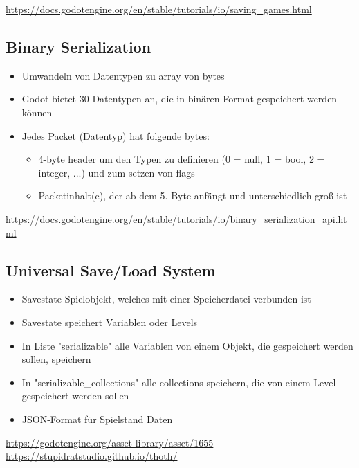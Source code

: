 \url{https://docs.godotengine.org/en/stable/tutorials/io/saving_games.html}\\

\subsection{Binary Serialization}

\begin{itemize}
    \item Umwandeln von Datentypen zu array von bytes
    \item Godot bietet 30 Datentypen an, die in binären Format gespeichert werden können
    \item Jedes Packet (Datentyp) hat folgende bytes:
    \begin{itemize}
        \item 4-byte header um den Typen zu definieren (0 = null, 1 = bool, 2 = integer, ...) und zum setzen von flags
        \item Packetinhalt(e), der ab dem 5. Byte anfängt und unterschiedlich groß ist 
    \end{itemize}
\end{itemize}

\url{https://docs.godotengine.org/en/stable/tutorials/io/binary_serialization_api.html}

\subsection{Universal Save/Load System}

\begin{itemize}
    \item Savestate Spielobjekt, welches mit einer Speicherdatei verbunden ist
    \item Savestate speichert Variablen oder Levels
    \item In Liste "serializable" alle Variablen von einem Objekt, die gespeichert werden sollen, speichern
    \item In "serializable\_collections" alle collections speichern, die von einem Level gespeichert werden sollen
    \item JSON-Format für Spielstand Daten
\end{itemize}

\url{https://godotengine.org/asset-library/asset/1655}\\
\url{https://stupidratstudio.github.io/thoth/}